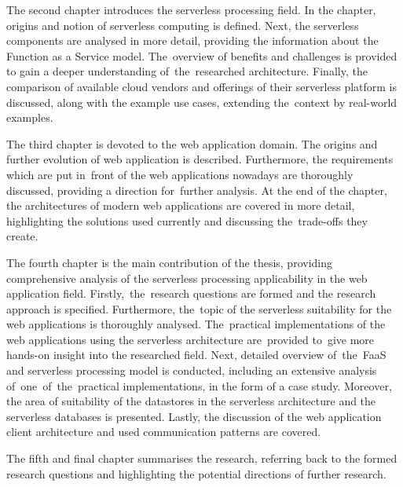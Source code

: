 The second chapter introduces the serverless processing field.
In the chapter, origins and notion of serverless computing is defined.
Next, the serverless components are analysed in more detail, providing the information about the Function as a Service model.
The~overview of benefits and challenges is provided to gain a deeper understanding of~the~researched architecture.
Finally, the comparison of available cloud vendors and offerings of their serverless platform is discussed, along with the example use cases, extending the~context by real-world examples.

The third chapter is devoted to the web application domain. The origins and further evolution of web application is described.
Furthermore, the requirements which are put in~front of the web applications nowadays are thoroughly discussed, providing a direction for~further analysis.
At the end of the chapter, the architectures of modern web applications are covered in more detail, highlighting the solutions used currently and discussing the~trade-offs they create.

The fourth chapter is the main contribution of the thesis, providing comprehensive analysis of the serverless processing applicability in the web application field.
Firstly,~the~research questions are formed and the research approach is specified.
Furthermore, the~topic of the serverless suitability for the web applications is thoroughly analysed.
The~practical implementations of the web applications using the serverless architecture are~provided to~give more hands-on insight into the researched field.
Next, detailed overview of~the~FaaS and serverless processing model is conducted, including an extensive analysis of~one~of~the~practical implementations, in the form of a case study.
Moreover, the area of suitability of the datastores in the serverless architecture and the serverless databases is presented.
Lastly, the discussion of the web application client architecture and used communication patterns are covered.

The fifth and final chapter summarises the research, referring back to the formed research questions and highlighting the potential directions of further research.

